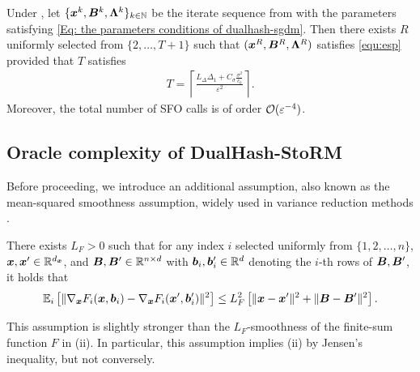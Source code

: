 \begin{theorem}
\label{Theorem: the oracle complexity in SGDM} 
Under , let \(\{\bm{x}^k, \bm{B}^k, \bm{\Lambda}^k\}_{k \in \mathbb{N}}\) be the iterate sequence from  with the parameters satisfying \eqref{Eq: the parameters conditions of dualhash-sgdm}. Then there exists $R$ uniformly selected from $\{2,\dots,T+1\}$ such that \( (\bm{x}^R, \bm{B}^R, \bm{\Lambda}^R )\) satisfies \eqref{equ:esp} provided that \(T\) satisfies
\begin{align}
    \label{Eq: the iterate number upper bound of algorithm SGDM}
        T = \left\lceil \frac{L_{\Delta} \Delta_1+ C_{\sigma}\frac{\sigma^2}{c_b}}{\varepsilon^2} \right\rceil.
\end{align}
Moreover, the total number of SFO calls is of order \(\mathcal{O}(\varepsilon^{-4})\).
\end{theorem}
\subsection{Oracle complexity of DualHash-StoRM} 
Before proceeding, we introduce an additional assumption, also known as the mean-squared smoothness
assumption, widely used in variance reduction methods \cite{arjevani2023lower,fang2018spider,tran2020hybridvrsgd,driggs2021stochastic}.
\begin{assumption}
\label{Ass: the mean squared smoothness of F}
    There exists $L_{F} > 0$ such that for any index $i$ selected uniformly from $\{1,2,\ldots,n\}$, $\bm{x}, \bm{x}' \in \mathbb{R}^{d_{\bm{x}}}$, and $\bm{B}, \bm{B}' \in \mathbb{R}^{n\times d}$ with $\bm{b}_i,\bm{b}_i' \in \mathbb{R}^d$ denoting the \(i\)-th rows of $\bm{B},\bm{B}'$, it holds that
\begin{align}
    \mathbb{E}_{i}\left[ \| \nabla_{\bm{x}} F_{i}(\bm{x},\bm{b}_i) - \nabla_{\bm{x}} F_{i}(\bm{x}',\bm{b}_i')\|^{2}\right] \leq L^{2}_F \left[ \|\bm{x} - \bm{x}'\|^{2} + \|\bm{B} - \bm{B}'\|^{2} \right]. \notag
\end{align}
\end{assumption}
This assumption is slightly stronger than the \(L_F\)-smoothness of the finite-sum function \(F\) in (ii). In particular, this assumption implies (ii) by Jensen's inequality, but not conversely.

